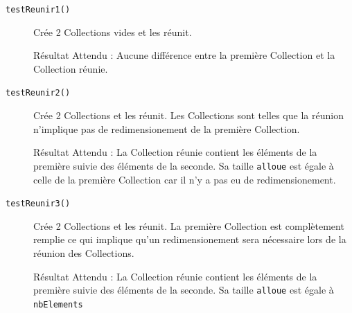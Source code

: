 \documentclass[11pt]{article}
\begin{document}
\begin{description}
	\item[\texttt{testReunir1()}] Crée 2 Collections vides et les réunit.
	
	Résultat Attendu : Aucune différence entre la première Collection et la Collection réunie.
	
	\item[\texttt{testReunir2()}] Crée 2 Collections et les réunit. Les Collections sont telles que la réunion n'implique pas de redimensionement de la première Collection.
	
	Résultat Attendu : La Collection réunie contient les éléments de la première suivie des éléments de la seconde. Sa taille \texttt{alloue} est égale à celle de la première Collection car il n'y a pas eu de redimensionement.
	
	\item[\texttt{testReunir3()}] Crée 2 Collections et les réunit. La première Collection est complètement remplie ce qui implique qu'un redimensionement sera nécessaire lors de la réunion des Collections.
	
	Résultat Attendu : La Collection réunie contient les éléments de la première suivie des éléments de la seconde. Sa taille \texttt{alloue} est égale à \texttt{nbElements}
 
\end{description} 
\end{document}
